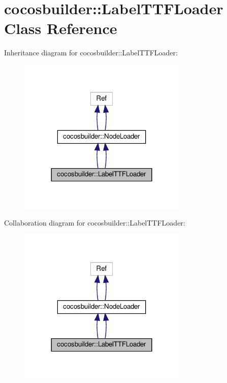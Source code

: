 \hypertarget{classcocosbuilder_1_1LabelTTFLoader}{}\section{cocosbuilder\+:\+:Label\+T\+T\+F\+Loader Class Reference}
\label{classcocosbuilder_1_1LabelTTFLoader}


Inheritance diagram for cocosbuilder\+:\+:Label\+T\+T\+F\+Loader\+:
\nopagebreak
\begin{figure}[H]
\begin{center}
\leavevmode
\includegraphics[width=228pt]{classcocosbuilder_1_1LabelTTFLoader__inherit__graph}
\end{center}
\end{figure}


Collaboration diagram for cocosbuilder\+:\+:Label\+T\+T\+F\+Loader\+:
\nopagebreak
\begin{figure}[H]
\begin{center}
\leavevmode
\includegraphics[width=228pt]{classcocosbuilder_1_1LabelTTFLoader__coll__graph}
\end{center}
\end{figure}
